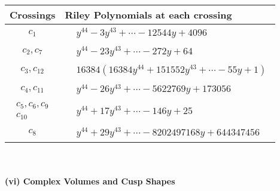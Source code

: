 \documentclass[1p]{elsarticle_modified}
\theoremstyle{definition}
\begin{document}
\begin{tabular}{m{50pt}|m{274pt}}
Crossings & \hspace{64pt}Riley Polynomials at each crossing \\
\hline $$\begin{aligned}c_{1}\end{aligned}$$&$\begin{aligned}
&y^{44}-3 y^{43}+\cdots-12544 y+4096
\end{aligned}$\\
\hline $$\begin{aligned}c_{2},c_{7}\end{aligned}$$&$\begin{aligned}
&y^{44}-23 y^{43}+\cdots-272 y+64
\end{aligned}$\\
\hline $$\begin{aligned}c_{3},c_{12}\end{aligned}$$&$\begin{aligned}
&16384(16384 y^{44}+151552 y^{43}+\cdots-55 y+1)
\end{aligned}$\\
\hline $$\begin{aligned}c_{4},c_{11}\end{aligned}$$&$\begin{aligned}
&y^{44}-26 y^{43}+\cdots-5622769 y+173056
\end{aligned}$\\
\hline $$\begin{aligned}c_{5},c_{6},c_{9}\\c_{10}\end{aligned}$$&$\begin{aligned}
&y^{44}+17 y^{43}+\cdots-146 y+25
\end{aligned}$\\
\hline $$\begin{aligned}c_{8}\end{aligned}$$&$\begin{aligned}
&y^{44}+29 y^{43}+\cdots-8202497168 y+644347456
\end{aligned}$\\
\hline
\end{tabular}\\~\\
\newpage\flushleft \textbf{(vi) Complex Volumes and Cusp Shapes}
\end{document}
